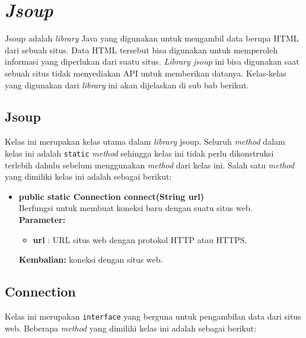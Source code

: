 \section{\textit{Jsoup}}
\label{sec:jsoup}
Jsoup adalah \textit{library} Java yang digunakan untuk mengambil data berupa HTML dari sebuah situs. Data HTML tersebut bisa digunakan untuk memperoleh informasi yang diperlukan dari suatu situs\cite{jsoup}. \textit{Library jsoup} ini bisa digunakan saat sebuah situs tidak menyediakan API untuk memberikan datanya. Kelas-kelas yang digunakan dari \textit{library} ini akan dijelaskan di sub bab berikut.

\subsection{Jsoup}
Kelas ini merupakan kelas utama dalam \textit{library} jsoup. Seluruh \textit{method} dalam kelas ini adalah \texttt{static} \textit{method} sehingga kelas ini tidak perlu dikonstruksi terlebih dahulu sebelum menggunakan \textit{method} dari kelas ini. Salah satu \textit{method} yang dimiliki kelas ini adalah sebagai berikut:
\begin{itemize}
	\item \textbf{public static Connection connect(String url)} \\
		Berfungsi untuk membuat koneksi baru dengan suatu situs web. \\
		\textbf{Parameter:}
		\begin{itemize}
			\item \textbf{url} : URL situs web dengan protokol HTTP atau HTTPS.
		\end{itemize}
		\textbf{Kembalian:} koneksi dengan situs web.
\end{itemize}

\subsection{Connection}
Kelas ini merupakan \texttt{interface} yang berguna untuk pengambilan data dari situs web. Beberapa \textit{method} yang dimiliki kelas ini adalah sebagai berikut:

